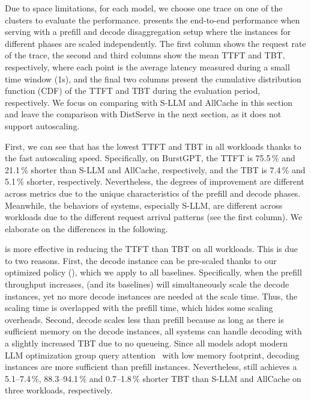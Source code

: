 \noindent
Due to space limitations,
for each model, we choose one trace on one of the clusters to evaluate the performance.
{} presents the end-to-end performance
when serving with a prefill and decode disaggregation setup
where the instances for different phases are scaled independently.
The first column shows the request rate of the trace,
the second and third columns show the mean TTFT and TBT, respectively,
where each point is the average latency measured during a small time window (1s),
and the final two columns present the cumulative distribution function (CDF) of the TTFT and TBT
during the evaluation period, respectively.
We focus on comparing with S-LLM and AllCache in this section
and leave the comparison with DistServe in the next section,
as it does not support autoscaling.

First, we can see that {\sys} has the lowest TTFT and TBT in all workloads
thanks to the fast autoscaling speed.
Specifically,
on BurstGPT, the TTFT is 75.5\,\% and 21.1\,\% shorter than S-LLM and AllCache,
respectively,
and the TBT is 7.4\,\% and 5.1\,\% shorter, respectively.
Nevertheless,
the degrees of improvement are different across metrics
due to the unique characteristics of the prefill and decode phases.
Meanwhile,
the behaviors of systems, especially S-LLM, are different across workloads
due to the different request arrival patterns (see the first column).
We elaborate on the differences in the following.

{\sys} is more effective in reducing the TTFT than TBT on all workloads.
This is due to two reasons.
First, the decode instance can be pre-scaled 
thanks to our optimized policy (\textsection{\ref{sec:design-llm}}),
which we apply to all baselines. 
Specifically, 
when the prefill throughput increases,
{\sys} (and its baselines) will simultaneously scale the decode instances,
yet no more decode instances are needed at the scale time.
Thus, the scaling time is overlapped with the prefill time, 
which hides some scaling overheads.
Second,
decode scales less than prefill because
as long as there is sufficient memory on the decode instances,
all systems can handle decoding with a slightly increased TBT due to no queueing.
Since all models adopt modern LLM optimization group query attention~\cite{gqa}
with low memory footprint,
decoding instances are more sufficient than prefill instances.
Nevertheless, {\sys} still achieves a 5.1--7.4\,\%, 88.3--94.1\,\% and 0.7--1.8\,\%
shorter TBT than S-LLM and AllCache on three workloads, respectively.

